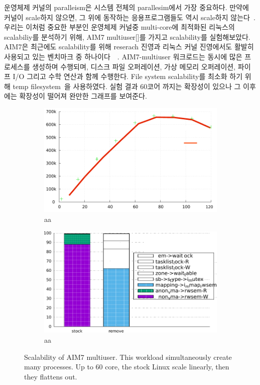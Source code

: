 운영체제 커널의 paralleism은 시스템 전체의 parallesim에서 가장 중요하다. 
만약에 커널이 scale하지 않으면, 그 위에 동작하는 응용프로그램들도 역시 scale하지 않는다~\cite{Clements15SCR}.
우리는 이처럼 중요한 부분인 운영체제 커널중 multi-core에 최적화된 리눅스의 scalabiliy를 분석하기 위해, AIM7
multiuser[]를 가지고 scalability를 실험해보았다.
AIM7은 최근에도 scalability를 위해 reserach 진영과 리눅스 커널 진영에서도 활발히 사용되고 있는 벤치마크 중
하나이다~\cite{Bueso2015STP}~\cite{Bueso2014MCS}.
AIM7-multiuser 워크로드는 동시에 많은 프로세스를 생성하며 수행되며, 디스크 파일 오퍼레이션, 가상 메모리 오퍼레이션, 파이프
I/O 그리고 수학 연산과 함께 수행한다.
File system scalability를 최소화 하기 위해 temp filesystem~\cite{Rohland2001Tempfs}을
사용하였다.
실험 결과 60코어 까지는 확장성이 있으나 그 이후에는 확장성이 떨어져 완만한 그래프를 보여준다. 

\else

\begin{figure}
  \begin{subfigure}[b]{0.23\textwidth}
    \includegraphics[width=\textwidth]{graph/aim7_default}
    \caption{aa}
  \end{subfigure}%
  \begin{subfigure}[b]{0.25\textwidth}
    \includegraphics[width=\textwidth]{graph/lockstat}
    \caption{aa}
  \end{subfigure}
  \centering
  \caption{Scalability of AIM7 multiuser. This workload simultaneously create
  many processes.
  Up to 60 core, the stock Linux scale linearly, then they flattens out.}
  \label{fig:aim7_default}
\end{figure}


